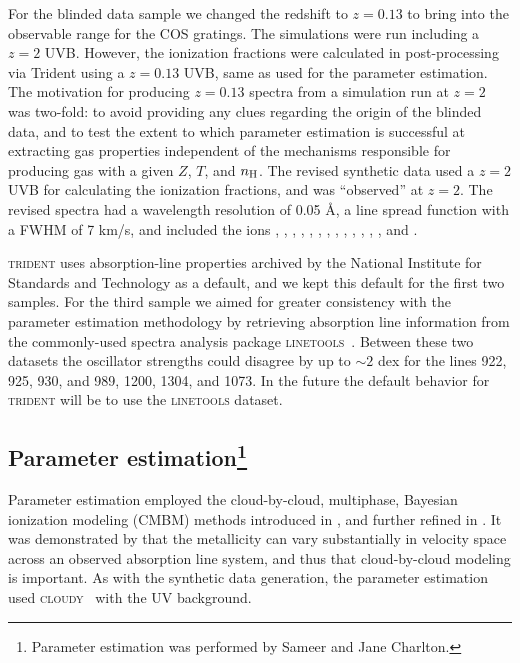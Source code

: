 \documentclass[fleqn,usenatbib]{mnras}
\begin{document}
For the blinded data sample we changed the redshift to $z=0.13$ to bring  into the observable range for the COS gratings.
The simulations were run including a $z=2$ UVB.
However, the ionization fractions were calculated in post-processing via Trident using a $z=0.13$ \cite{haardt2012RADIATIVE} UVB, same as used for the parameter estimation.
The motivation for producing $z=0.13$ spectra from a simulation run at $z=2$ was two-fold:
to avoid providing any clues regarding the origin of the blinded data,
and to test the extent to which parameter estimation is successful at extracting gas properties independent of the mechanisms responsible for producing gas with a given $Z$, $T$, and $n_{\rm H}$.
The revised synthetic data used a $z=2$ UVB for calculating the ionization fractions, and was ``observed'' at $z=2$.
The revised spectra had a wavelength resolution of 0.05 \AA,
a line spread function with a FWHM of 7 km/s,
and included the ions , , , , , , , , , , , , , and .

\textsc{trident} uses absorption-line properties archived by the National Institute for Standards and Technology as a default, and we kept this default for the first two samples.
For the third sample we aimed for greater consistency with the parameter estimation methodology by retrieving absorption line information from the commonly-used spectra analysis package \textsc{linetools}~\citep{prochaska2016Linetools}.
Between these two datasets the oscillator strengths could disagree by up to $\sim 2$ dex for the lines  922, 925, 930, and 989,  1200,  1304, and  1073.
In the future the default behavior for \textsc{trident} will be to use the \textsc{linetools} dataset.

\subsection[Parameter estimation]{Parameter estimation\footnote{
 Parameter estimation was performed by Sameer and Jane Charlton.}}
\label{s:  parameter estimation}

 Parameter estimation employed the cloud-by-cloud, multiphase, Bayesian ionization modeling (CMBM) methods introduced in \cite{sameer2021Cloudbycloud}, and further refined in \cite{sameer2022Probing}.
 It was demonstrated by \cite{zahedy2019Probing} that the metallicity can vary substantially in velocity space across an observed absorption line system, and thus that cloud-by-cloud modeling is important.
 As with the synthetic data generation, the  parameter estimation used \textsc{cloudy}~\citep{ferland20132013} with the \cite{haardt2012RADIATIVE} UV background.
\end{document}
